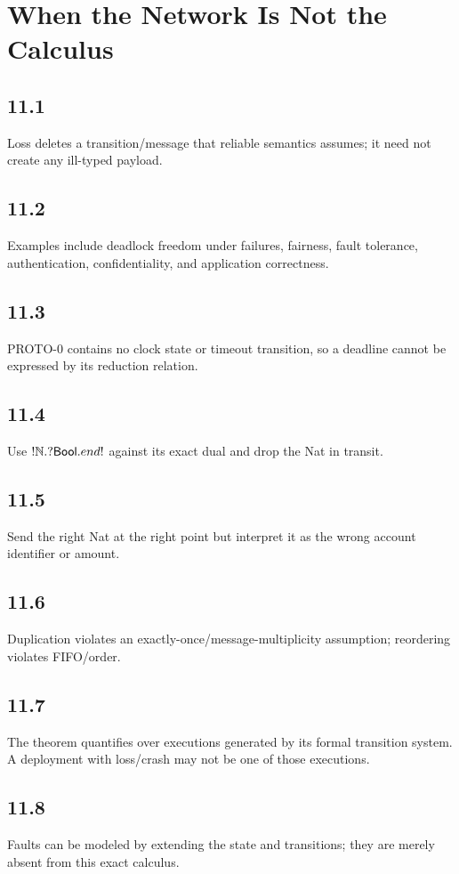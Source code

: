 \chapter{When the Network Is Not the Calculus}

\section*{11.1}
Loss deletes a transition/message that reliable semantics assumes; it need not create any ill-typed payload.

\section*{11.2}
Examples include deadlock freedom under failures, fairness, fault tolerance, authentication, confidentiality, and application correctness.

\section*{11.3}
PROTO-0 contains no clock state or timeout transition, so a deadline cannot be expressed by its reduction relation.

\section*{11.4}
Use $!\mathbb{N}.?\mathsf{Bool}.end!$ against its exact dual and drop the Nat in transit.

\section*{11.5}
Send the right Nat at the right point but interpret it as the wrong account identifier or amount.

\section*{11.6}
Duplication violates an exactly-once/message-multiplicity assumption; reordering violates FIFO/order.

\section*{11.7}
The theorem quantifies over executions generated by its formal transition system. A deployment with loss/crash may not be one of those executions.

\section*{11.8}
Faults can be modeled by extending the state and transitions; they are merely absent from this exact calculus.

